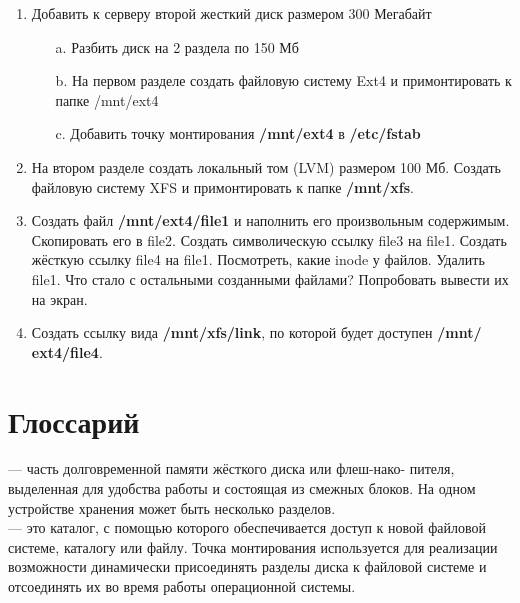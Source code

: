 \documentclass[14pt, a4paper]{article}
\begin{document}
\begin{enumerate}
    \item Добавить к серверу второй жесткий диск размером 300 Мегабайт
    \begin{enumerate}
        \item[a.] Разбить диск на 2 раздела по 150 Мб
        \item[b.] На первом разделе создать файловую систему Ext4 и примонтировать к папке
        /mnt/ext4
        \item[c.] Добавить точку монтирования \textbf{/mnt/ext4} в \textbf{/etc/fstab}
    \end{enumerate}
    \item На втором разделе создать локальный том (LVM) размером 100 Мб. Создать файловую
    систему XFS и примонтировать к папке \textbf{/mnt/xfs}.
    \item Создать файл \textbf{/mnt/ext4/file1} и наполнить его произвольным содержимым. Скопировать его в
    file2. Создать символическую ссылку file3 на file1. Создать жёсткую ссылку file4 на file1.
    Посмотреть, какие inode у файлов. Удалить file1. Что стало с остальными созданными
    файлами? Попробовать вывести их на экран.
    \item Создать ссылку вида \textbf{/mnt/xfs/link}, по которой будет доступен \textbf{/mnt/ \\ ext4/file4}.
\end{enumerate}

\section*{Глоссарий} 

\href{https://help.ubuntu.ru/wiki/разделы_и_файловые_системы_linux}{} — часть долговременной памяти жёсткого диска или флеш-нако- 
пителя, выделенная для удобства работы и состоящая из смежных блоков. 
На одном устройстве хранения может быть несколько разделов.\\

\noindent \href{https://ru.wikipedia.org/wiki/Точка_монтирования}{} — это каталог, с помощью которого обеспечивается доступ к новой файловой
системе, каталогу или файлу. Точка монтирования используется для реализации возможности
динамически присоединять разделы диска к файловой системе и отсоединять их во время работы
операционной системы.\\
\end{document}
